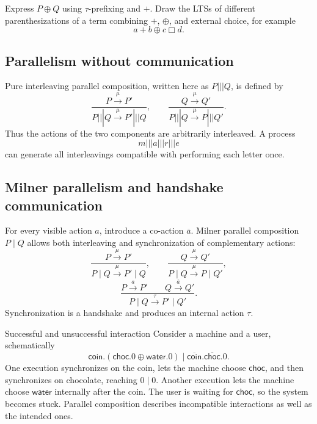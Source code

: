 \documentclass[a4paper]{article}
\newcommand{\trans}[1]{\xrightarrow{#1}}
\begin{document}
\begin{snippetexercise}{}
    Express \(P\oplus Q\) using \(\tau\)-prefixing and \(+\).
    Draw the LTSs of different parenthesizations of a term combining \(+\), \(\oplus\), and external choice, for example
    \[
        a+b\oplus c\Box d.
    \]
\end{snippetexercise}

\subsection{Parallelism without communication}

Pure interleaving parallel composition, written here as \(P\mathbin{|||}Q\), is defined by
\[
    \frac{P\trans{\mu}P'}{P|||Q\trans{\mu}P'|||Q},
    \qquad
    \frac{Q\trans{\mu}Q'}{P|||Q\trans{\mu}P|||Q'}.
\]
Thus the actions of the two components are arbitrarily interleaved.
A process
\[
    m|||a|||r|||e
\]
can generate all interleavings compatible with performing each letter once.

\subsection{Milner parallelism and handshake communication}

For every visible action \(a\), introduce a co-action \(\overline a\).
Milner parallel composition \(P\mid Q\) allows both interleaving and synchronization of complementary actions:
\[
    \frac{P\trans{\mu}P'}{P\mid Q\trans{\mu}P'\mid Q},
    \qquad
    \frac{Q\trans{\mu}Q'}{P\mid Q\trans{\mu}P\mid Q'},
\]
\[
    \frac{P\trans{a}P'\qquad Q\trans{\overline a}Q'}
    {P\mid Q\trans{\tau}P'\mid Q'}.
\]
Synchronization is a handshake and produces an internal action \(\tau\).

\begin{snippetexample}{Successful and unsuccessful interaction}
    Consider a machine and a user, schematically
    \[
        \mathsf{coin}.(\mathsf{choc}.0\oplus\mathsf{water}.0)
        \mid
        \overline{\mathsf{coin}}.\overline{\mathsf{choc}}.0.
    \]
    One execution synchronizes on the coin, lets the machine choose \(\mathsf{choc}\), and then synchronizes on chocolate, reaching \(0\mid0\).
    Another execution lets the machine choose \(\mathsf{water}\) internally after the coin. The user is waiting for \(\mathsf{choc}\), so the system becomes stuck.
    Parallel composition describes incompatible interactions as well as the intended ones.
\end{snippetexample}
\end{document}
